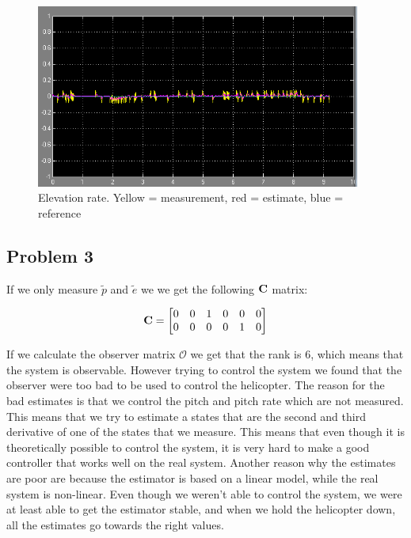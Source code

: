 \begin{figure}[H]
	\centering
	\includegraphics[width=0.95\textwidth]{images/est_med_int/ed_est.png}
	\caption{Elevation rate. Yellow = measurement, red = estimate, blue = reference}
	\label{fig:edest}
\end{figure}


\subsection{Problem 3}
If we only measure $\tilde p$ and $\tilde e$ we we get the following $\mathbf{C}$ matrix:

\begin{equation}
	\mathbf{C} = \begin{bmatrix}
		0 & 0 & 1 & 0 & 0 & 0\\
		0 & 0 & 0 & 0 & 1 & 0
	\end{bmatrix}
\end{equation}

If we calculate the observer matrix $\mathcal{O}$ we get that the rank is 6, which means that the system is observable. However trying to control the system we found that the observer were too bad to be used to control the helicopter. The reason for the bad estimates is that we control the pitch and pitch rate which are not measured. This means that we try to estimate a states that are the second and third derivative of one of the states that we measure. This means that even though it is theoretically possible to control the system, it is very hard to make a good controller that works well on the real system. Another reason why the estimates are poor are because the estimator is based on a linear model, while the real system is non-linear. Even though we weren't able to control the system, we were at least able to get the estimator stable, and when we hold the helicopter down, all the estimates go towards the right values.